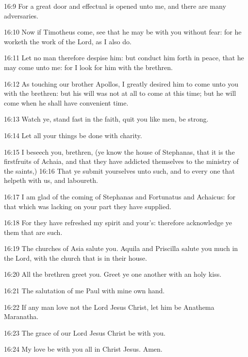 16:9 For a great door and effectual is opened unto me, and there are
many adversaries.

16:10 Now if Timotheus come, see that he may be with you without fear:
for he worketh the work of the Lord, as I also do.

16:11 Let no man therefore despise him: but conduct him forth in
peace, that he may come unto me: for I look for him with the brethren.

16:12 As touching our brother Apollos, I greatly desired him to come
unto you with the brethren: but his will was not at all to come at
this time; but he will come when he shall have convenient time.

16:13 Watch ye, stand fast in the faith, quit you like men, be strong.

16:14 Let all your things be done with charity.

16:15 I beseech you, brethren, (ye know the house of Stephanas, that
it is the firstfruits of Achaia, and that they have addicted
themselves to the ministry of the saints,) 16:16 That ye submit
yourselves unto such, and to every one that helpeth with us, and
laboureth.

16:17 I am glad of the coming of Stephanas and Fortunatus and
Achaicus: for that which was lacking on your part they have supplied.

16:18 For they have refreshed my spirit and your's: therefore
acknowledge ye them that are such.

16:19 The churches of Asia salute you. Aquila and Priscilla salute you
much in the Lord, with the church that is in their house.

16:20 All the brethren greet you. Greet ye one another with
an holy kiss.

16:21 The salutation of me Paul with mine own hand.

16:22 If any man love not the Lord Jesus Christ, let him be
Anathema Maranatha.

16:23 The grace of our Lord Jesus Christ be with you.

16:24 My love be with you all in Christ Jesus. Amen.

